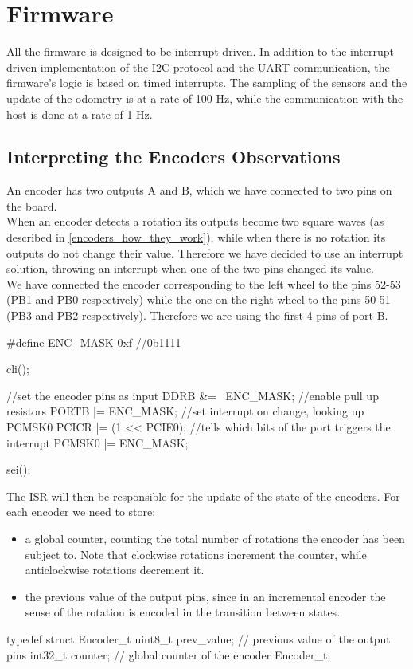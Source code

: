 \section{Firmware}

All the firmware is designed to be interrupt driven. In addition to the interrupt driven implementation of the I2C protocol and the UART communication, the firmware's logic is based on timed interrupts. The sampling of the sensors and the update of the odometry is at a rate of 100 Hz, while the communication with the host is done at a rate of 1 Hz.

\subsection{Interpreting the Encoders Observations}

An encoder has two outputs A and B, which we have connected to two pins on the board.\\
When an encoder detects a rotation its outputs become two square waves (as described in \ref{encoders_how_they_work}), while when there is no rotation its outputs do not change their value. Therefore we have decided to use an interrupt solution, throwing an interrupt when one of the two pins changed its value.\\
We have connected the encoder corresponding to the left wheel to the pins 52-53 (PB1 and PB0 respectively\supercite{mega2560_datasheet}) while the one on the right wheel to the pins 50-51 (PB3 and PB2 respectively). Therefore we are using the first 4 pins of port B.
\begin{ccode}
	#define ENC_MASK 0xf //0b1111
	
	cli();

		//set the encoder pins as input
	DDRB &= ~ENC_MASK;
		//enable pull up resistors
	PORTB |= ENC_MASK;
		//set interrupt on change, looking up PCMSK0
	PCICR |= (1 << PCIE0);
		//tells which bits of the port triggers the interrupt
	PCMSK0 |= ENC_MASK;

	sei();
\end{ccode}

The ISR will then be responsible for the update of the state of the encoders. For each encoder we need to store:
\begin{itemize}
	\item a global counter, counting the total number of rotations the encoder has been subject to. Note that clockwise rotations increment the counter, while anticlockwise rotations decrement it.
	\item the previous value of the output pins, since in an incremental encoder the sense of the rotation is encoded in the transition between states.
\end{itemize}
\begin{ccode}
	typedef struct Encoder_t {
		uint8_t prev_value;	// previous value of the output pins
		int32_t counter;		// global counter of the encoder
	} Encoder_t;
\end{ccode}


